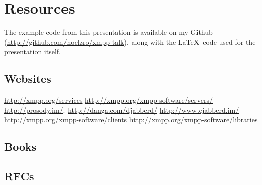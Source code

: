 \appendix
\section{Resources}

The example code from this presentation is available on my Github (\url{http://github.com/hoelzro/xmpp-talk}), along
with the \LaTeX\ code used for the presentation itself.

\subsection{Websites}

\url{http://xmpp.org/services}
\url{http://xmpp.org/xmpp-software/servers/}
\url{http://prosody.im/}.
\url{http://danga.com/djabberd/}
\url{http://www.ejabberd.im/}
\url{http://xmpp.org/xmpp-software/clients}
\url{http://xmpp.org/xmpp-software/libraries}

\subsection{Books}

\subsection{RFCs}
